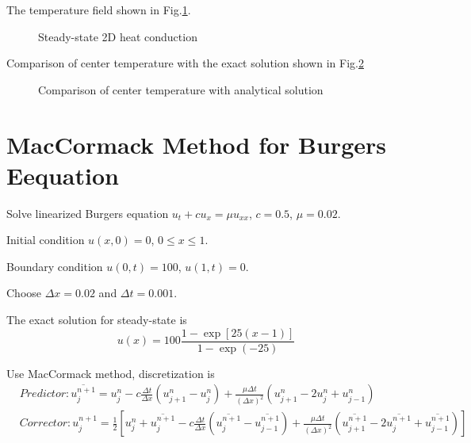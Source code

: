 \documentclass[12pt,a4paper]{article} %
\begin{document}
\begin{CJK}{UTF8}{song}
The temperature field shown in Fig.\ref{Fig.3}.
\begin{figure}[htbp]
\centering
{}
\caption{Steady-state 2D heat conduction } \label{Fig.3}
\end{figure}

Comparison of center temperature with the exact solution shown in Fig.\ref{Fig.3compare}
\begin{figure}[htbp]
\centering
{}
\caption{Comparison of center temperature with analytical solution} \label{Fig.3compare}
\end{figure}


\newpage
\section{MacCormack Method for Burgers Eequation}
Solve linearized  Burgers equation $u_{t}+cu_{x}=\mu u_{xx}$, $c=0.5$, $\mu=0.02$.

Initial condition $u(x,0)=0$, $0\leq  x \leq 1$.

Boundary condition $u(0,t)=100$, $u(1,t)=0$.

Choose $\Delta x=0.02$ and $\Delta t=0.001$.

The exact solution for steady-state is
\begin{equation}
u(x)=100\frac{1-\exp[25(x-1)]}{1-\exp(-25)}
\end{equation}

Use MacCormack method, discretization is
\begin{equation}
    \begin{split}
& Predictor:  \overline{u_{j}^{n+1}}=u_{j}^{n}-c\frac{\Delta t}{\Delta x}(u_{j+1}^{n}-u_{j}^{n})+\frac{\mu \Delta t}{(\Delta x)^{2}}(u_{j+1}^{n}-2u_{j}^{n}+u_{j-1}^{n}) \\
& Corrector:  u_{j}^{n+1}=\frac{1}{2}[u_{j}^{n}+\overline{u_{j}^{n+1}}-c\frac{\Delta t}{\Delta x}(\overline{u_{j}^{n+1}}-\overline{u_{j-1}^{n+1}})+\frac{\mu \Delta t}{(\Delta x)^{2}}(\overline{u_{j+1}^{n+1}}-2\overline{u_{j}^{n+1}}+\overline{u_{j-1}^{n+1}})] \\
    \end{split}
\end{equation}


\end{CJK}
\end{document}
